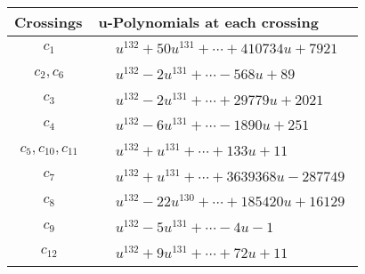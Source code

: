\documentclass[1p]{elsarticle_modified}
\theoremstyle{definition}
\begin{document}
\begin{tabular}{m{50pt}|m{274pt}}
Crossings & \hspace{64pt}u-Polynomials at each crossing \\
\hline $$\begin{aligned}c_{1}\end{aligned}$$&$\begin{aligned}
&u^{132}+50 u^{131}+\cdots+410734 u+7921
\end{aligned}$\\
\hline $$\begin{aligned}c_{2},c_{6}\end{aligned}$$&$\begin{aligned}
&u^{132}-2 u^{131}+\cdots-568 u+89
\end{aligned}$\\
\hline $$\begin{aligned}c_{3}\end{aligned}$$&$\begin{aligned}
&u^{132}-2 u^{131}+\cdots+29779 u+2021
\end{aligned}$\\
\hline $$\begin{aligned}c_{4}\end{aligned}$$&$\begin{aligned}
&u^{132}-6 u^{131}+\cdots-1890 u+251
\end{aligned}$\\
\hline $$\begin{aligned}c_{5},c_{10},c_{11}\end{aligned}$$&$\begin{aligned}
&u^{132}+u^{131}+\cdots+133 u+11
\end{aligned}$\\
\hline $$\begin{aligned}c_{7}\end{aligned}$$&$\begin{aligned}
&u^{132}+u^{131}+\cdots+3639368 u-287749
\end{aligned}$\\
\hline $$\begin{aligned}c_{8}\end{aligned}$$&$\begin{aligned}
&u^{132}-22 u^{130}+\cdots+185420 u+16129
\end{aligned}$\\
\hline $$\begin{aligned}c_{9}\end{aligned}$$&$\begin{aligned}
&u^{132}-5 u^{131}+\cdots-4 u-1
\end{aligned}$\\
\hline $$\begin{aligned}c_{12}\end{aligned}$$&$\begin{aligned}
&u^{132}+9 u^{131}+\cdots+72 u+11
\end{aligned}$\\
\hline
\end{tabular}\\~\\
\end{document}

